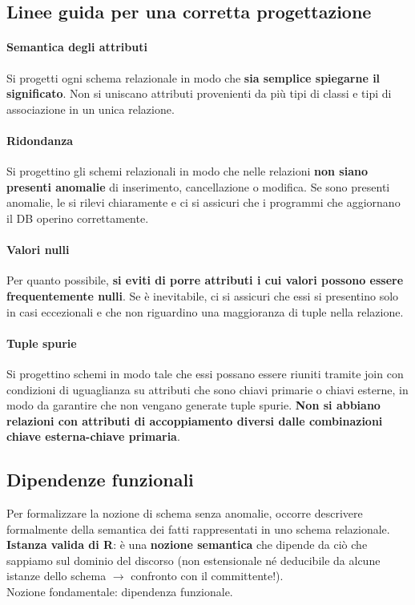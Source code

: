 \documentclass[10pt]{book}
\begin{document}
\subsection{Linee guida per una corretta progettazione}
\paragraph{Semantica degli attributi} Si progetti ogni schema relazionale in modo che \textbf{sia semplice spiegarne il significato}. Non si uniscano attributi provenienti da più tipi di classi e tipi di associazione in un unica relazione.
\paragraph{Ridondanza} Si progettino gli schemi relazionali in modo che nelle relazioni \textbf{non siano presenti anomalie} di inserimento, cancellazione o modifica. Se sono presenti anomalie, le si rilevi chiaramente e ci si assicuri che i programmi che aggiornano il DB operino correttamente.
\paragraph{Valori nulli} Per quanto possibile, \textbf{si eviti di porre attributi i cui valori possono essere frequentemente nulli}. Se è inevitabile, ci si assicuri che essi si presentino solo in casi eccezionali e che non riguardino una maggioranza di tuple nella relazione.
\paragraph{Tuple spurie} Si progettino schemi in modo tale che essi possano essere riuniti tramite join con condizioni di uguaglianza su attributi che sono chiavi primarie o chiavi esterne, in modo da garantire che non vengano generate tuple spurie. \textbf{Non si abbiano relazioni con attributi di accoppiamento diversi dalle combinazioni chiave esterna-chiave primaria}.
\subsection{Dipendenze funzionali}
Per formalizzare la nozione di schema senza anomalie, occorre descrivere formalmente della semantica dei fatti rappresentati in uno schema relazionale.\\
\textbf{Istanza valida di R}: è una \textbf{nozione semantica} che dipende da ciò che sappiamo sul dominio del discorso (non estensionale né deducibile da alcune istanze dello schema $\rightarrow$ confronto con il committente!).\\
Nozione fondamentale: dipendenza funzionale.
\end{document}
